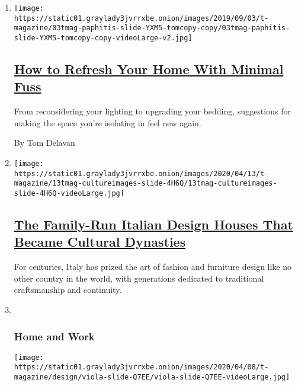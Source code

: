 \begin{enumerate}
\def\labelenumi{\arabic{enumi}.}
\item
  \texttt{[image: https://static01.graylady3jvrrxbe.onion/images/2019/09/03/t-magazine/03tmag-paphitis-slide-YXM5-tomcopy-copy/03tmag-paphitis-slide-YXM5-tomcopy-copy-videoLarge-v2.jpg]}

  \hypertarget{how-to-refresh-your-home-with-minimal-fuss}{%
  \subsection{\texorpdfstring{\href{/2020/05/21/t-magazine/redecorate-home-coronavirus.html}{How
  to Refresh Your Home With Minimal
  Fuss}}{How to Refresh Your Home With Minimal Fuss}}\label{how-to-refresh-your-home-with-minimal-fuss}}

  From reconsidering your lighting to upgrading your bedding,
  suggestions for making the space you're isolating in feel new again.

  By Tom Delavan
\item
  \texttt{[image: https://static01.graylady3jvrrxbe.onion/images/2020/04/13/t-magazine/13tmag-cultureimages-slide-4H6Q/13tmag-cultureimages-slide-4H6Q-videoLarge.jpg]}

  \hypertarget{the-family-run-italian-design-houses-that-became-cultural-dynasties}{%
  \subsection{\texorpdfstring{\href{/interactive/2020/04/13/t-magazine/italian-fashion-design-houses.html}{The
  Family-Run Italian Design Houses That Became Cultural
  Dynasties}}{The Family-Run Italian Design Houses That Became Cultural Dynasties}}\label{the-family-run-italian-design-houses-that-became-cultural-dynasties}}

  For centuries, Italy has prized the art of fashion and furniture
  design like no other country in the world, with generations dedicated
  to traditional craftsmanship and continuity.
\item ~
  \hypertarget{home-and-work}{%
  \subsubsection{Home and Work}\label{home-and-work}}

  \texttt{[image: https://static01.graylady3jvrrxbe.onion/images/2020/04/08/t-magazine/design/viola-slide-Q7EE/viola-slide-Q7EE-videoLarge.jpg]}


\end{enumerate}
